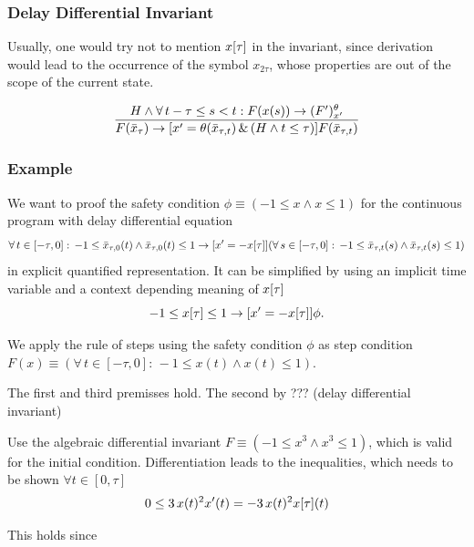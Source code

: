 \documentclass[10pt]{article}
\begin{document}
        \subsubsection{Delay Differential Invariant}
            \label{sec:elay-differential-invariant}

            Usually, one would try not to mention $x[\tau]$ in the invariant, since derivation would lead to the occurrence of the symbol $x_{2\tau}$, whose properties are out of the scope of the current state.

            \begin{equation}
                \frac{H\wedge\forall\,t-\tau\leq s<t: F(x(s))\rightarrow (F')^{\theta}_{x'}}{F(\bar{x}_{\tau})\rightarrow [x'=\theta(\bar{x}_{\tau,t})\,\&\,(H\wedge t\leq\tau)]F(\bar{x}_{\tau,t})}
            \end{equation}

        \subsubsection{Example}
            \label{sec:example}
            We want to proof the safety condition $\phi\equiv(-1\leq x\wedge x\leq 1)$ for the continuous program with delay differential equation
            \begin{equation}
                \forall\,t\in[-\tau,0]:\,-1\leq\bar{x}_{\tau,0}(t)\wedge\bar{x}_{\tau,0}(t)\leq 1
                \rightarrow
                [x'=-x[\tau]] (\forall\,s\in[-\tau,0]:\,-1\leq\bar{x}_{\tau,t}(s)\wedge\bar{x}_{\tau,t}(s)\leq 1)
            \end{equation}
            in explicit quantified representation. It can be simplified by using an implicit time variable and a context depending meaning of $x[\tau]$
            \begin{equation}
                -1\leq x[\tau]\leq 1 \rightarrow [x'=-x[\tau]]\phi.
            \end{equation}

            We apply the rule of steps using the safety condition $\phi$ as step condition $F(x)\equiv(\forall\,t\in[-\tau,0]:\,-1\leq x(t)\wedge x(t)\leq 1)$.

            The first and third premisses hold. The second by ??? (delay differential invariant)

            Use the algebraic differential invariant $F\equiv(-1\leq x^3\wedge x^3\leq1)$, which is valid for the initial condition. Differentiation leads to the inequalities, which needs to be shown $\forall t\in[0,\tau]$
            \begin{equation}
                0\leq 3\,x(t)^2 x'(t) = -3\,x(t)^2 x[\tau](t)
            \end{equation}

            This holds since










\nocite{*}


\end{document}
